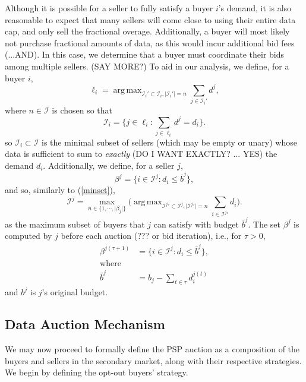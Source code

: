 \documentclass[12pt]{article}
\theoremstyle{definition}
\newcommand{\mcI}{\mathcal{I}}
\DeclareMathOperator*{\argmax}{arg\,max}
\begin{document}
\begin{multicols}{2}
Although it is possible for a seller to fully satisfy a buyer $i$'s demand, it
is also reasonable to expect that many sellers will come close to using their
entire data cap, and only sell the fractional overage. Additionally, a buyer
will most likely not purchase fractional amounts of data, as this would incur
additional bid fees (...AND). In this case, we
determine that a buyer must coordinate their bids among multiple sellers. (SAY
MORE?) To aid in our analysis, we define, for a buyer $i$,
$$
    \ell_i =\argmax_{\mcI_i' \subset \mcI_i, \vert\mcI_i'\vert =
n}\sum_{j\in\mcI_i'} d^j,
$$
where $n\in\mcI$ is chosen so that
\begin{equation}\label{minset}
    \mcI_i = \bigg\lbrace j \in  \ell_i:
\displaystyle\sum_{j\in \ell_i} d^j = d_i \bigg\rbrace.
\end{equation} 
so $\mcI_i \subset \mcI$ is the
minimal subset of sellers (which may be empty or unary) whose data is
sufficient to sum to \emph{exactly}
(DO I WANT EXACTLY? ... YES) the demand $d_i$.
Additionally, we define, for a seller $j$,
$$
    \beta^j = \bigg\lbrace i\in\mcI^j: 
d_i \le \bar{b}^j \bigg\rbrace,
$$
and so, similarly to (\ref{minset}),
\begin{equation}\label{maxset}
    \mcI^j = \max_{n\in\lbrace 1,\cdots, \vert \beta_j\vert\rbrace}\bigg(\argmax_{{\mcI^j}' \subset \mcI^j,
\vert{\mcI^j}'\vert = n}\sum_{i\in{\mcI^j}'} d_i\bigg).
\end{equation}
as the maximum subset of buyers that $j$ can satisfy with budget
$\bar{b}^j$. The set $\beta^j$ is computed by $j$ before each auction (??? or
bid iteration),
i.e., for $\tau >0$, 
\begin{align*}
    \beta^{j(\tau+1)} &= \bigg\lbrace i\in\mcI^j: 
        d_i \le \bar{b}^j \bigg\rbrace, \\
    \text{where}&\\
    \bar{b}^j &= b_j - \sum_{t\in
\tau} d_i^{j(t)}
\end{align*}
and $b^j$ is $j$'s original budget.

\subsection{Data Auction Mechanism}
We may now proceed to formally define the PSP auction as a composition of the
buyers and sellers in the secondary market, along with their respective
strategies. We begin by defining the opt-out buyers' strategy.


\end{multicols}
\end{document}
